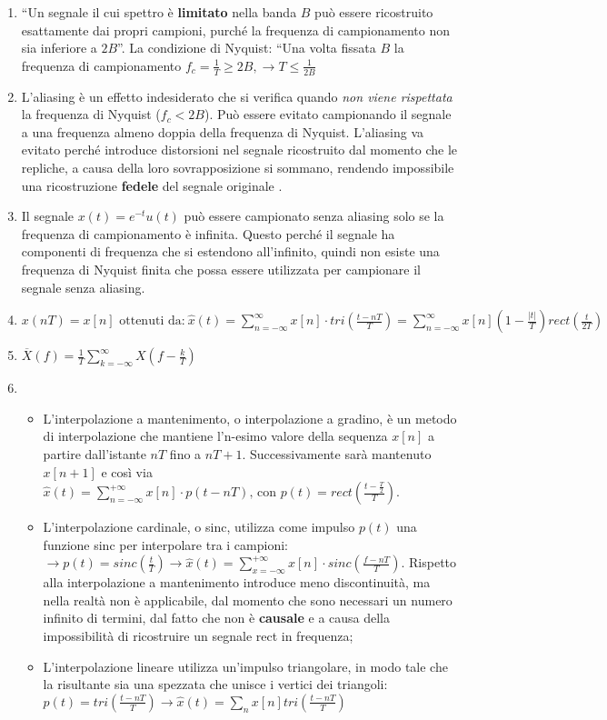 \documentclass[
]{article}
\begin{document}
\begin{enumerate}
\def\labelenumi{\arabic{enumi}.}
\setcounter{enumi}{14}
\item
  ``Un segnale il cui spettro è \textbf{limitato} nella banda \(B\) può
  essere ricostruito esattamente dai propri campioni, purché la
  frequenza di campionamento non sia inferiore a \(2B\)''. La condizione
  di Nyquist: ``Una volta fissata \(B\) la frequenza di campionamento
  \(f_c = \frac{1}{T} \geq 2B, \to T \leq \frac{1}{2B}\)
\item
  L'aliasing è un effetto indesiderato che si verifica quando \emph{non
  viene rispettata} la frequenza di Nyquist (\(f_c < 2B\)). Può essere
  evitato campionando il segnale a una frequenza almeno doppia della
  frequenza di Nyquist. L'aliasing va evitato perché introduce
  distorsioni nel segnale ricostruito dal momento che le repliche, a
  causa della loro sovrapposizione si sommano, rendendo impossibile una
  ricostruzione \textbf{fedele} del segnale originale .
\item
  Il segnale \(x(t)=e^{-t}u(t)\) può essere campionato senza aliasing
  solo se la frequenza di campionamento è infinita. Questo perché il
  segnale ha componenti di frequenza che si estendono all'infinito,
  quindi non esiste una frequenza di Nyquist finita che possa essere
  utilizzata per campionare il segnale senza aliasing.
\item
  \(\displaystyle x(nT) = x[n] \text{ ottenuti da:} \ \hat{x}(t)= \sum_{n= -\infty}^{\infty} x[n] \cdot tri(\frac{t-nT}{T})= \sum_{n= -\infty}^{\infty}x[n] (1-\frac{|t|}{T})rect(\frac{t}{2T})\)
\item
  \(\overline{X}(f) = \frac{1}{T}\sum_{k=-\infty}^{\infty}X(f-\frac{k}{T})\)
\item
  \begin{itemize}
  \item
    L'interpolazione a mantenimento, o interpolazione a gradino, è un
    metodo di interpolazione che mantiene l'n-esimo valore della
    sequenza \(x[n]\) a partire dall'istante \(nT\) fino a \(nT+1\).
    Successivamente sarà mantenuto \(x[n+1]\) e così via\\
    \(\hat{x}(t)=\sum_{n=-\infty}^{+\infty}x[n]\cdot p(t-nT)\text{, con } p(t)= rect(\frac{t-\frac{T}{2}}{T})\).
  \item
    L'interpolazione cardinale, o sinc, utilizza come impulso \(p(t)\)
    una funzione sinc per interpolare tra i campioni:
    \(\to p(t)=sinc(\frac{t}{T}) \to \hat{x}(t)=\sum_{x=-\infty}^{+\infty} x[n]\cdot sinc(\frac{f-nT}{T})\).
    Rispetto alla interpolazione a mantenimento introduce meno
    discontinuità, ma nella realtà non è applicabile, dal momento che
    sono necessari un numero infinito di termini, dal fatto che non è
    \textbf{causale} e a causa della impossibilità di ricostruire un
    segnale rect in frequenza;
  \item
    L'interpolazione lineare utilizza un'impulso triangolare, in modo
    tale che la risultante sia una spezzata che unisce i vertici dei
    triangoli:
    \(p(t) = tri(\frac{t-nT}{T}) \to \hat{x}(t) = \sum_n x[n]tri(\frac{t-nT}{T})\)


\end{itemize}
\end{enumerate}
\end{document}
